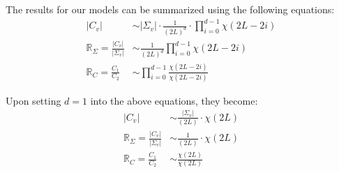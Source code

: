 \documentclass[journal]{IEEEtran}
\begin{document}
The results for our models can be summarized using the following equations:
\begin{align*}
  |C_v| &\sim |\Sigma_v| \cdot \frac{1}{(2L)^d} \cdot \prod_{i=0}^{d-1} \chi (2L-2i) \\ %
  \mathbb{R}_{\Sigma} = \frac{|C_v|}{|\Sigma_v|} &\sim \frac{1}{(2L)^d} \prod^{d-1}_{i=0} \chi(2L-2i) \\ %
\mathbb{R}_{C} = \frac{C_1}{C_2} &\sim \prod_{i=0}^{d-1} \frac{\chi(2L-2i)}{\chi(2L-2i)}
\end{align*}

Upon setting $d=1$ into the above equations,
  they become:
\begin{align*}
  |C_v| &\sim  \frac{|\Sigma_v|}{(2L)} \cdot \chi (2L) \\ %
  \mathbb{R}_{\Sigma} = \frac{|C_v|}{|\Sigma_v|} &\sim \frac{1}{(2L)} \cdot \chi(2L) \\ %
\mathbb{R}_{C} = \frac{C_1}{C_2} &\sim \frac{\chi(2L)}{\chi(2L)}
\end{align*}
\end{document}
